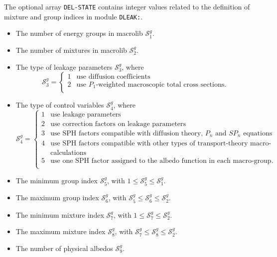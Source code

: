 \vskip 0.2cm

The optional array {\tt DEL-STATE} contains integer values related to the definition of mixture and group indices in module {\tt DLEAK:}.
\begin{itemize}
\item The number of energy groups in macrolib $\mathcal{S}^{g}_{1}$.
\item The number of mixtures in macrolib $\mathcal{S}^{g}_{2}$.
\item The type of leakage parameters $\mathcal{S}^{g}_{3}$,
where
\begin{displaymath}
\mathcal{S}^{g}_{3} = \left\{
\begin{array}{rl}
1 & \textrm{use diffusion coefficients} \\
2 & \textrm{use $P_1$-weighted macroscopic total cross sections.} \\
\end{array} \right.
\end{displaymath}

\item The type of control variables $\mathcal{S}^{g}_{4}$,
where
\begin{displaymath}
\mathcal{S}^{g}_{4} = \left\{
\begin{array}{rl}
1 & \textrm{use leakage parameters} \\
2 & \textrm{use correction factors on leakage parameters} \\
3 & \textrm{use SPH factors compatible with diffusion theory, $P_n$ and $SP_n$ equations} \\
4 & \textrm{use SPH factors compatible with other types of transport-theory macro-} \\
& \textrm{calculations} \\
5 & \textrm{use one SPH factor assigned to the albedo function in each macro-group.} \\
\end{array} \right.
\end{displaymath}

\item The minimum group index $\mathcal{S}^{g}_{5}$, with $1 \le \mathcal{S}^{g}_{5}\le \mathcal{S}^{g}_{1}$.
\item The maximum group index $\mathcal{S}^{g}_{6}$, with $\mathcal{S}^{g}_{5} \le \mathcal{S}^{g}_{6}\le \mathcal{S}^{g}_{2}$.
\item The minimum mixture index $\mathcal{S}^{g}_{7}$, with $1 \le \mathcal{S}^{g}_{7}\le \mathcal{S}^{g}_{2}$.
\item The maximum mixture index $\mathcal{S}^{g}_{8}$, with $\mathcal{S}^{g}_{7} \le \mathcal{S}^{g}_{8}\le \mathcal{S}^{g}_{2}$.
\item The number of physical albedos $\mathcal{S}^{g}_{9}$.

\end{itemize}
\goodbreak


